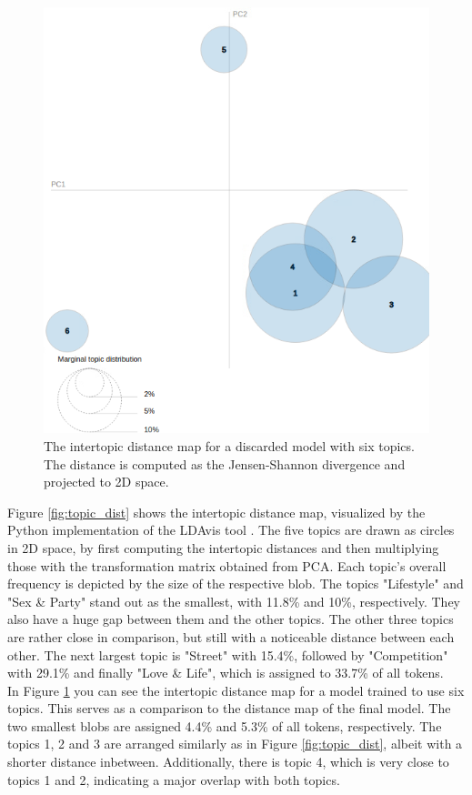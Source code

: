 \documentclass[conference]{IEEEtran}
\begin{document}
\begin{figure}[!t]
\includegraphics[width=\linewidth]{figures/topic_dist_bad.png}
\vspace*{-8mm}
\caption{The intertopic distance map for a discarded model with six topics. The distance is computed as the Jensen-Shannon divergence and projected to 2D space.}
\label{fig:topic_dist_bad}
\end{figure}

Figure \ref{fig:topic_dist} shows the intertopic distance map, visualized by the Python implementation of the LDAvis tool \cite{sievert-shirley-2014-ldavis}. The five topics are drawn as circles in 2D space, by first computing the intertopic distances and then multiplying those with the transformation matrix obtained from PCA. Each topic's overall frequency is depicted by the size of the respective blob. The topics "Lifestyle" and "Sex \& Party" stand out as the smallest, with 11.8\% and 10\%, respectively. They also have a huge gap between them and the other topics. The other three topics are rather close in comparison, but still with a noticeable distance between each other. The next largest topic is "Street" with 15.4\%, followed by "Competition" with 29.1\% and finally "Love \& Life", which is assigned to 33.7\% of all tokens.\\
In Figure \ref{fig:topic_dist_bad} you can see the intertopic distance map for a model trained to use six topics. This serves as a comparison to the distance map of the final model. The two smallest blobs are assigned 4.4\% and 5.3\% of all tokens, respectively. The topics 1, 2 and 3 are arranged similarly as in Figure \ref{fig:topic_dist}, albeit with a shorter distance inbetween. Additionally, there is topic 4, which is very close to topics 1 and 2, indicating a major overlap with both topics.
\end{document}

